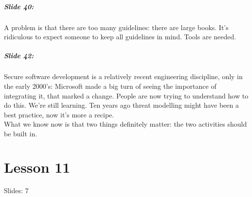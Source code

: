 \documentclass[10pt,a4paper]{report}
\begin{document}
\paragraph{Slide 40:} A problem is that there are too many guidelines: there are large books. It's ridiculous to expect someone to keep all guidelines in mind. Tools are needed. 

\paragraph{Slide 42:} Secure software development is a relatively recent engineering discipline, only in the early 2000's: Microsoft made a big turn of seeing the importance of integrating it, that marked a change. People are now trying to understand how to do this. We're still learning. Ten years ago threat modelling might have been a best practice, now it's more a recipe. \\
What we know now is that two things definitely matter: the two activities should be built in. 

\chapter{Lesson 11}
Slides: 7
\end{document}

